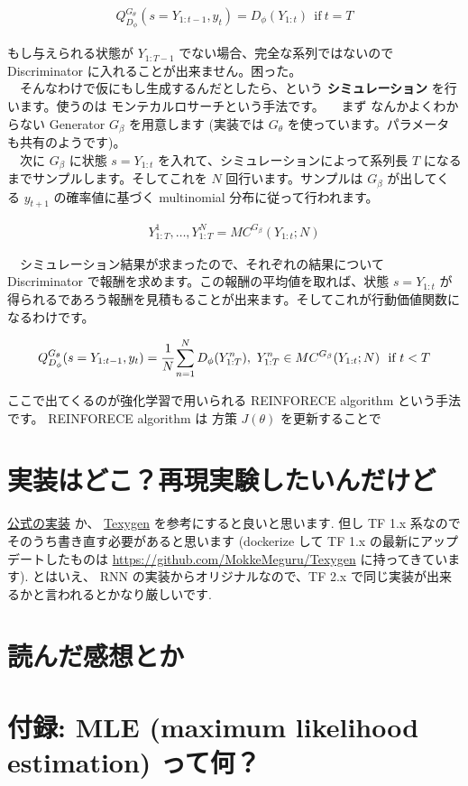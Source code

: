 \documentclass[a4paper, dvipdfmx, 10pt]{article}
\begin{document}
\begin{eqnarray}
Q^{G_{\theta}}_{D_{\phi}}(s = Y_{1:t-1}, y_t) = D_{\phi}(Y_{1:t}) \  \ \text{if} \ t = T
\end{eqnarray}

もし与えられる状態が \(Y_{1:T-1}\) でない場合、完全な系列ではないので Discriminator に入れることが出来ません。困った。\\
　そんなわけで仮にもし生成するんだとしたら、という \textbf{シミュレーション} を行います。使うのは モンテカルロサーチという手法です。
　まず なんかよくわからない Generator \(G_{\beta}\) を用意します (実装では \(G_{\theta}\) を使っています。パラメータも共有のようです)。\\
　次に \(G_{\beta}\) に状態 \(s = Y_{1:t}\) を入れて、シミュレーションによって系列長 \(T\) になるまでサンプルします。そしてこれを \(N\) 回行います。サンプルは \(G_{\beta}\) が出してくる \(y_{t+1}\) の確率値に基づく multinomial 分布に従って行われます。

\begin{eqnarray}
{Y_{1:T}^1, \dots ,  Y_{1:T}^{N}} = MC^{G_{\beta}}(Y_{1:t};N)
\end{eqnarray}

　シミュレーション結果が求まったので、それぞれの結果について Discriminator で報酬を求めます。この報酬の平均値を取れば、状態 \(s = Y_{1:t}\) が得られるであろう報酬を見積もることが出来ます。そしてこれが行動価値関数になるわけです。

\begin{eqnarray}
Q^{G_{\theta}}_{D_{\phi}}(s = Y_{1:t-1}, y_t) = \cfrac{1}{N}\sum^{N}_{n=1} D_{\phi}(Y^n_{1:T}),\ Y^n_{1:T} \in MC^{G_{\beta}}(Y_{1:t};N) \  \ \text{if} \ t < T
\end{eqnarray}

ここで出てくるのが強化学習で用いられる REINFORECE algorithm という手法です。 REINFORECE algorithm は 方策 \(J(\theta)\) を更新することで


\section{実装はどこ？再現実験したいんだけど}
\label{sec:orgbeb2989}
\href{https://github.com/LantaoYu/SeqGAN}{公式の実装} か、 \href{https://github.com/geek-ai/Texygen}{Texygen} を参考にすると良いと思います. 但し TF 1.x 系なのでそのうち書き直す必要があると思います (dockerize して TF 1.x の最新にアップデートしたものは \url{https://github.com/MokkeMeguru/Texygen} に持ってきています). とはいえ、 RNN の実装からオリジナルなので、TF 2.x で同じ実装が出来るかと言われるとかなり厳しいです.
\section{読んだ感想とか}
\label{sec:org278aa8c}
\section{付録: MLE (maximum likelihood estimation) って何？}
\label{sec:org3c2a9a0}
\end{document}
